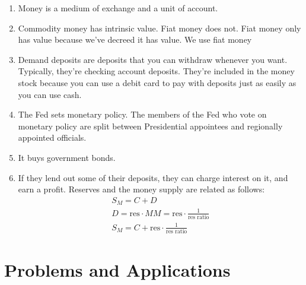 \documentclass{article}
\begin{document}
\begin{enumerate}

\item Money is a medium of exchange and a unit of account.

\item Commodity money has intrinsic value. Fiat money does not. Fiat money only has value because we've decreed it has value. We use fiat money

\item Demand deposits are deposits that you can withdraw whenever you want. Typically, they're checking account deposits. They're included in the money stock because you can use a debit card to pay with deposits just as easily as you can use cash.

\item The Fed sets monetary policy. The members of the Fed who vote on monetary policy are split between Presidential appointees and regionally appointed officials.

\item It buys government bonds.

\item If they lend out some of their deposits, they can charge interest on it, and earn a profit. Reserves and the money supply are related as follows:
	\begin{gather*}
	S_M = C + D \\
	D = \text{res} \cdot MM = \text{res} \cdot \frac{1}{\text{res ratio}} \\
	S_M = C + \text{res} \cdot \frac{1}{\text{res ratio}} 
	\end{gather*}

\end{enumerate}

\section*{Problems and Applications}
\end{document}
